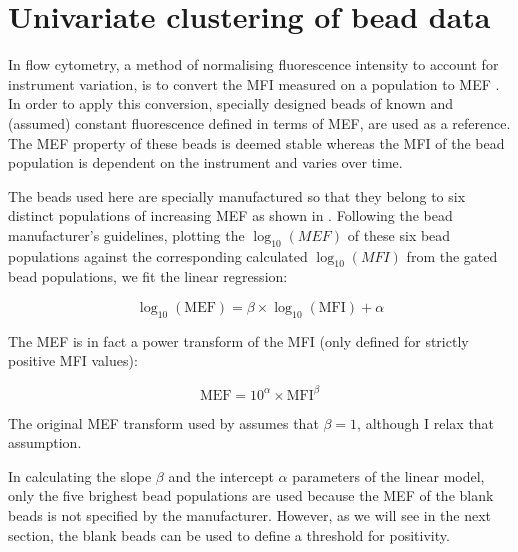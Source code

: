 


\section{Univariate clustering of bead data}

In flow cytometry, a method of normalising fluorescence intensity to account for instrument variation, is to convert the \gls{MFI}
measured on a population to \gls{MEF} \citep{Schwartz:1996jj,Dendrou:2009bl}.
In order to apply this conversion, specially designed beads of known and (assumed) constant fluorescence defined in terms of \gls{MEF}, are used as a reference.
The MEF property of these beads is deemed stable whereas the MFI of the bead population is dependent on the instrument and varies over time.

The beads used here are specially manufactured so that they belong to six distinct populations of increasing MEF as shown in .
Following the bead manufacturer's guidelines, plotting the $\log_{10}(MEF)$ of these six bead populations against
the corresponding calculated $\log_{10}(MFI)$ from the gated bead populations, we fit the linear regression:

\begin{equation}
    \log_{10}(\text{MEF})=\beta \times \log_{10}(\text{MFI}) + \alpha
\label{equ:MEF}
\end{equation}

The MEF is in fact a power transform of the MFI (only defined for strictly positive MFI values):

\[
    \text{MEF}= 10^\alpha \times \text{MFI}^\beta
\]

The original MEF transform used by \citet{Dendrou:2009bl} assumes that $\beta=1$,
although I relax that assumption.

In calculating the slope $\beta$ and the intercept $\alpha$ parameters of the linear model,
only the five brighest bead populations are used because the MEF of the blank beads is not specified by the manufacturer.
However, as we will see in the next section, the blank beads can be used to define a threshold for positivity.

